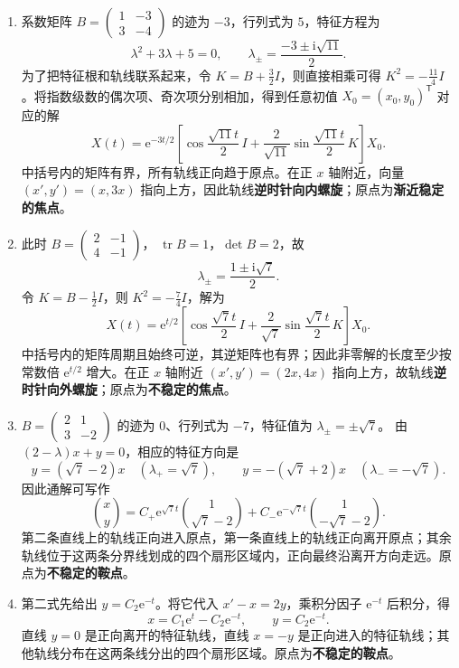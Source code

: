 \documentclass[UTF8,a4paper,11pt]{ctexart}
\newcommand{\e}{\mathrm e}
\begin{document}
\begin{solution}
\begin{enumerate}[label=(\arabic*)]
\item 系数矩阵
$B=\begin{pmatrix}1&-3\\3&-4\end{pmatrix}$
的迹为 $-3$，行列式为 $5$，特征方程为
\[
\lambda^2+3\lambda+5=0,\qquad
\lambda_\pm=\frac{-3\pm\mathrm i\sqrt{11}}2.
\]
为了把特征根和轨线联系起来，令 $K=B+\frac32I$，则直接相乘可得
$K^2=-\frac{11}{4}I$。将指数级数的偶次项、奇次项分别相加，得到任意初值 $X_0=(x_0,y_0)^{\mathsf T}$ 对应的解
\[
X(t)=\e^{-3t/2}
\left[
\cos\frac{\sqrt{11}t}{2}\,I+
\frac{2}{\sqrt{11}}\sin\frac{\sqrt{11}t}{2}\,K
\right]X_0.
\]
中括号内的矩阵有界，所有轨线正向趋于原点。在正 $x$ 轴附近，向量 $(x',y')=(x,3x)$ 指向上方，因此轨线\textbf{逆时针向内螺旋}；原点为\textbf{渐近稳定的焦点}。

\item 此时
$B=\begin{pmatrix}2&-1\\4&-1\end{pmatrix}$，
$\operatorname{tr}B=1$，$\det B=2$，故
\[
\lambda_\pm=\frac{1\pm\mathrm i\sqrt7}{2}.
\]
令 $K=B-\frac12I$，则 $K^2=-\frac74I$，解为
\[
X(t)=\e^{t/2}
\left[
\cos\frac{\sqrt7t}{2}\,I+
\frac{2}{\sqrt7}\sin\frac{\sqrt7t}{2}\,K
\right]X_0.
\]
中括号内的矩阵周期且始终可逆，其逆矩阵也有界；因此非零解的长度至少按常数倍 $\e^{t/2}$ 增大。在正 $x$ 轴附近 $(x',y')=(2x,4x)$ 指向上方，故轨线\textbf{逆时针向外螺旋}；原点为\textbf{不稳定的焦点}。

\item
$B=\begin{pmatrix}2&1\\3&-2\end{pmatrix}$ 的迹为 $0$、行列式为 $-7$，特征值为 $\lambda_\pm=\pm\sqrt7$。
由 $(2-\lambda)x+y=0$，相应的特征方向是
\[
y=(\sqrt7-2)x\quad(\lambda_+=\sqrt7),\qquad
y=-(\sqrt7+2)x\quad(\lambda_-=-\sqrt7).
\]
因此通解可写作
\[
\binom{x}{y}
=C_+\e^{\sqrt7t}\binom{1}{\sqrt7-2}
 +C_-\e^{-\sqrt7t}\binom{1}{-\sqrt7-2}.
\]
第二条直线上的轨线正向进入原点，第一条直线上的轨线正向离开原点；其余轨线位于这两条分界线划成的四个扇形区域内，正向最终沿离开方向走远。原点为\textbf{不稳定的鞍点}。

\item 第二式先给出 $y=C_2\e^{-t}$。将它代入 $x'-x=2y$，乘积分因子 $\e^{-t}$ 后积分，得
\[
x=C_1\e^t-C_2\e^{-t},\qquad y=C_2\e^{-t}.
\]
直线 $y=0$ 是正向离开的特征轨线，直线 $x=-y$ 是正向进入的特征轨线；其他轨线分布在这两条线分出的四个扇形区域。原点为\textbf{不稳定的鞍点}。


\end{enumerate}
\end{solution}
\end{document}
